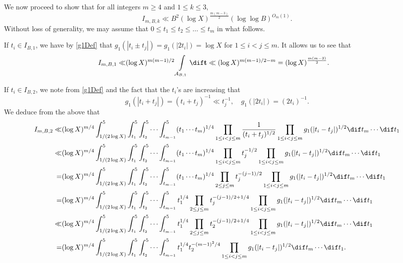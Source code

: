 \documentclass[twoside,leqno,10pt, A4]{amsart}
\begin{document}
  We now proceed to show that for all integers $m\geq 4$ and $1 \leq k \leq 3$,
\begin{equation}
\label{ind_hyp}
I_{m,B,k} \ll B^2 (\log X)^{\frac{m(m-3)}{2}}(\log \log B)^{O_m(1)}.
\end{equation}
  Without loss of generality, we may assume that $0 \leq t_1 \leq t_2 \leq \dots \leq t_m$ in what follows.


  If $t_i \in I_{B,1}$,  we have by \eqref{g1Def} that $g_1(|t_i \pm t_j|)=g_1(|2t_i|)=\log X$ for $1\leq i<j\leq m$. It allows us to see that
\begin{align}
\label{T1bound}
I_{m,B,1} \ll & (\log X)^{m(m-1)/2} \int\limits_{\mathcal{A}_{B,1}}\dif \mathbf{t} \ll  (\log X)^{m(m-1)/2-m} =(\log X)^{\frac{m(m-3)}{2}}.
\end{align}

  If $t_i \in I_{B,2}$,  we note from \eqref{g1Def} and the fact that the $t_i$'s are increasing that
$$ g_1(|t_i +t_j|)= (t_i+t_j)^{-1}\ll t_j^{-1}, \quad g_1(|2t_i|) = (2t_i)^{-1}.$$
  We deduce from the above that
\begin{align}
\label{Int4B}
\begin{split}
  I_{m,B,2} \ll & (\log X)^{m/4} \int_{1/(2\log X)}^{5}\int_{t_1}^{5}\int_{t_2}^{5}\cdots \int_{t_{m-1}}^{5}  (t_1\cdots t_m)^{1/4}\prod_{1\leq i<j\leq m}\frac{1}{(t_i+t_j)^{1/2}}\prod_{1\leq i<j\leq m} g_1(|t_i-t_j|)^{1/2}\dif t_m \cdots \dif t_1\\
  \ll & (\log X)^{m/4} \int_{1/(2\log X)}^{5}\int_{t_1}^{5}\int_{t_2}^{5}\cdots \int_{t_{m-1}}^{5}(t_1\cdots t_m)^{1/4}\prod_{1\leq i<j\leq m}t_j^{-1/2}\prod_{1\leq i<j\leq m} g_1(|t_i-t_j|)^{1/2}\dif t_m \cdots \dif t_1 \\
  = & (\log X)^{m/4} \int_{1/(2\log X)}^{5}\int_{t_1}^{5}\int_{t_2}^{5}\cdots \int_{t_{m-1}}^{5}(t_1\cdots t_m)^{1/4}\prod_{2\leq j\leq m}t_j^{-(j-1)/2}\prod_{1\leq i<j\leq m} g_1(|t_i-t_j|)^{1/2}\dif t_m \cdots \dif t_1 \\
  = & (\log X)^{m/4} \int_{1/(2\log X)}^{5}\int_{t_1}^{5}\int_{t_2}^{5}\cdots \int_{t_{m-1}}^{5}t_1^{1/4}\prod_{2\leq j\leq m}t_j^{-(j-1)/2+1/4}\prod_{1\leq i<j\leq m} g_1(|t_i-t_j|)^{1/2}\dif t_m \cdots \dif t_1 \\
  \ll & (\log X)^{m/4} \int_{1/(2\log X)}^{5}\int_{t_1}^{5}\int_{t_2}^{5}\cdots \int_{t_{m-1}}^{5}t_1^{1/4}\prod_{2\leq j\leq m}t_2^{-(j-1)/2+1/4}\prod_{1\leq i<j\leq m} g_1(|t_i-t_j|)^{1/2}\dif t_m \cdots \dif t_1 \\
   = & (\log X)^{m/4} \int_{1/(2\log X)}^{5}\int_{t_1}^{5}\int_{t_2}^{5}\cdots \int_{t_{m-1}}^{5}t_1^{1/4}t_2^{-(m-1)^2/4}\prod_{1\leq i<j\leq m} g_1(|t_i-t_j|)^{1/2}\dif t_m \cdots \dif t_1.
\end{split}
\end{align}
\end{document}
